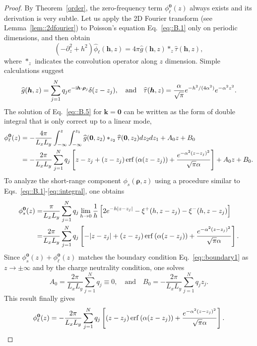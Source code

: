 \begin{proof}
	By Theorem~\ref{order}, the zero-frequency term $\phi^{\bm{0}}_{\ell}(z)$ always exists and its derivation is very subtle. Let us apply the 2D Fourier transform (see Lemma~\ref{lem::2dfourier}) to Poisson's equation Eq.~\eqref{eq::B.1} only on periodic dimensions, and then obtain
	\begin{equation}\label{eq::B.5}
		(-\partial_z^2+h^2)\widehat{\phi}_{\ell}(\bm{h},z)=4\pi\widehat{g}(\bm{h},z)\ast_{z}\widehat{\tau}(\bm{h},z),
	\end{equation}
	where $\ast_z$ indicates the convolution operator along $z$ dimension. Simple calculations suggest
	\begin{equation}
		\widehat{g}(\bm{h},z)=\sum_{j=1}^{N}q_{j} e^{-\mathrm{i} \bm{h}\cdot\bm{\rho}_{j}}\delta(z-z_{j}),\quad\text{and}\quad \widehat{\tau}(\bm{h},z)=\frac{\alpha}{\sqrt{\pi}} e^{-h^2/(4\alpha^2)}e^{-\alpha^2z^2}.
	\end{equation}
	The solution of Eq.~\eqref{eq::B.5} for $\bm{k}=\bm{0}$ can be written as the form of double integral that is only correct up to a linear mode,
	\begin{equation}\begin{split}
			\phi_{\ell}^{\bm{0}}(z)&=-\frac{4\pi}{L_xL_y}\int_{-\infty}^{z}\int_{-\infty}^{z_1}\widehat{g}(\bm{0},z_2)\ast_{z_2}\widehat{\tau}(\bm{0},z_2)dz_2dz_1+A_0z+B_0\\
			&=-\frac{2\pi}{L_xL_y}\sum_{j=1}^{N}q_{j}\left[z-z_{j}+(z-z_{j})\operatorname{erf}\left(\alpha(z-z_{j})\right)+\frac{e^{-\alpha^2(z-z_{j})^2}}{\sqrt{\pi}\alpha}\right]+A_0z+B_0.
		\end{split}
	\end{equation}
	To analyze the short-range component $\phi_{s}(\bm{\rho},z)$ using a procedure similar to Eqs.~\eqref{eq::B.1}-\eqref{eq::integral}, one obtains
	\begin{equation}\begin{split}
			\phi_{s}^{\bm{0}}(z) =& \frac{\pi}{L_x L_y} \sum_{j=1}^{N} q_{j} \lim_{h\rightarrow 0} \frac{1}{h} \left[2e^{-h|z-z_{j}|}-\xi^{+}(h,z-z_{j}) - \xi^{-}(h,z-z_{j})\right]\\
			=& \frac{2\pi}{L_xL_y}\sum_{j=1}^{N}q_{j}\left[-|z-z_{j}|+(z-z_{j})\operatorname{erf}\left(\alpha(z-z_{j})\right)+\frac{e^{-\alpha^2(z-z_{j})^2}}{\sqrt{\pi}\alpha}\right].
		\end{split}
	\end{equation}
	Since $\phi_{s}^{\bm{0}}(z)+\phi_{\ell}^{\bm{0}}(z)$ matches the boundary condition Eq.~\eqref{eq::boundary1} as $z\rightarrow \pm\infty$ and by the charge neutrality condition, one solves 
	\begin{equation}
		A_0 = \frac{2\pi}{L_xL_y}\sum_{j=1}^{N}q_{j} \equiv 0,\quad \text{and}\quad B_0=-\frac{2\pi}{L_xL_y}\sum_{j=1}^{N}q_{j}z_{j}.
	\end{equation}
	This result finally gives 
	\begin{equation}
		\phi_{\ell}^{\bm{0}}(z)=-\frac{2\pi}{L_xL_y}\sum_{j=1}^{N}q_{j}\left[(z-z_{j})\operatorname{erf}\left(\alpha(z-z_{j})\right)+\frac{e^{-\alpha^2(z-z_{j})^2}}{\sqrt{\pi}\alpha}\right].
	\end{equation}
\end{proof}

